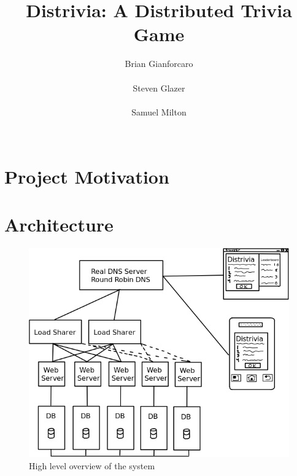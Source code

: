 \documentclass{dependencies/acm_proc_article-sp}
\begin{document}
\title{ Distrivia: A Distributed Trivia Game }
\author{
\alignauthor
Brian Gianforcaro \\
       \\
\alignauthor
Steven Glazer \\
       \\
\alignauthor
Samuel Milton \\
       \\
}
\maketitle


\section{Project Motivation}
\section{Architecture}
\begin{figure}[h!]
  \centering
    \includegraphics[scale=0.4]{diagram.png}
   \caption{High level overview of the system}
 \end{figure}
\end{document}
